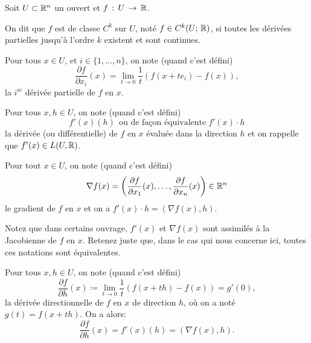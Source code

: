 Soit \(U\subset \mathbb{R}^n\) un ouvert et \(f\,:\,U\,\to\,\mathbb{R}\).

\begin{notation}
On dit que \(f\) est de classe \(C^k\) sur \(U\), noté \(f\in C^k(U;\,\mathbb{R})\), si toutes les dérivées partielles jusqu'à l'ordre \(k\) existent et sont continues.
\end{notation}

\begin{notation}
Pour tous \(x\in U\), et \(i\in \{1,\hdots,n\}\), on note (quand c'est défini)  
\begin{equation*}
\frac{\partial f}{\partial x_i}(x) = \lim_{t\to 0} \frac{1}{t}(f(x+te_i)-f(x)),
\end{equation*}
la \(i^{ie}\) dérivée partielle de \(f\) en \(x\).
\end{notation}

\begin{notation}
Pour tous \(x,h\in U\), on note (quand c'est défini)  
\begin{equation*}
f'(x)(h)\;\,\mbox{ou de façon équivalente} \;f'(x)\cdot h
\end{equation*}
la dérivée (ou différentielle) de \(f\) en \(x\) évaluée dans la direction \(h\) et on rappelle que \(f'(x)\in L(U,\mathbb{R})\).
\end{notation}

\begin{notation}
Pour tout \(x\in U\), on note (quand c'est défini)  
\begin{equation*}
\nabla f(x) = \left(\frac{\partial f}{\partial x_1}(x),\hdots,\frac{\partial f}{\partial x_n}(x) \right)\in \mathbb{R}^n
\end{equation*}
le gradient de \(f\) en \(x\) et on a \(f'(x)\cdot h = (\nabla f(x), h)\).
\end{notation}

\begin{notation}
Notez que dans certains ouvrage, \(f'(x)\) et \(\nabla f(x)\) sont assimilés à la Jacobienne de \(f\) en \(x\). Retenez juste que, dans le cas qui nous concerne ici, toutes ces notations sont équivalentes.
\end{notation}

\begin{notation}
Pour tous \(x,h\in U\), on note (quand c'est défini)  
\begin{equation*}
\frac{\partial f}{\partial h}(x) \coloneqq \lim_{t\to 0} \frac{1}{t}\left(f(x+th) - f(x)\right) = g'(0),
\end{equation*}
la dérivée directionnelle de \(f\) en \(x\) de direction \(h\), où on a noté \(g(t) = f(x+th)\). On a alors:
\begin{equation*}
\frac{\partial f}{\partial h}(x) = f'(x)(h) = \left(\nabla f(x), h\right).
\end{equation*}
\end{notation}

